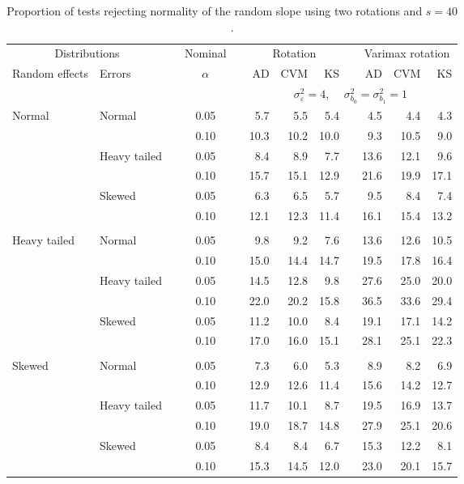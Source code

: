 \begin{table}[ht]
\centering
\caption{\label{tab:fixedsimb140} Proportion of tests rejecting normality of the random slope using two rotations and $s = 40$.}
\begin{scriptsize}
\begin{tabular}{ll p{.1cm} c p{.1cm} rrr p{.1cm} rrr}
  \hline
  \multicolumn{2}{c}{Distributions}& & Nominal & &  \multicolumn{3}{c}{Rotation} & & \multicolumn{3}{c}{Varimax rotation} \\ \cline{1-2} \cline{6-8} \cline{10-12}   
  Random effects & Errors & & $\alpha$ & & AD & CVM & KS & & AD & CVM & KS \\ 
   \hline
& && && \multicolumn{7}{c}{$\sigma_{\varepsilon}^2 = 4$, \ \ $\sigma_{b_0}^2 = \sigma_{b_1}^2 = 1$} \\ \cline{6-12}
\rowcolor{gray!20} Normal & Normal &  & 0.05 &  & 5.7 & 5.5 & 5.4 &  & 4.5 & 4.4 & 4.3 \\ 
\rowcolor{gray!20}    &  &  & 0.10 &  & 10.3 & 10.2 & 10.0 &  & 9.3 & 10.5 & 9.0 \\ 
\rowcolor{gray!20}    & Heavy tailed &  & 0.05 &  & 8.4 & 8.9 & 7.7 &  & 13.6 & 12.1 & 9.6 \\ 
\rowcolor{gray!20}    &  &  & 0.10 &  & 15.7 & 15.1 & 12.9 &  & 21.6 & 19.9 & 17.1 \\ 
\rowcolor{gray!20}    & Skewed &  & 0.05 &  & 6.3 & 6.5 & 5.7 &  & 9.5 & 8.4 & 7.4 \\ 
\rowcolor{gray!20}    &  &  & 0.10 &  & 12.1 & 12.3 & 11.4 &  & 16.1 & 15.4 & 13.2 \\ 
&&&&&&&&&&&\\
  Heavy tailed & Normal &  & 0.05 &  & 9.8 & 9.2 & 7.6 &  & 13.6 & 12.6 & 10.5 \\ 
   &  &  & 0.10 &  & 15.0 & 14.4 & 14.7 &  & 19.5 & 17.8 & 16.4 \\ 
   & Heavy tailed &  & 0.05 &  & 14.5 & 12.8 & 9.8 &  & 27.6 & 25.0 & 20.0 \\ 
   &  &  & 0.10 &  & 22.0 & 20.2 & 15.8 &  & 36.5 & 33.6 & 29.4 \\ 
   & Skewed &  & 0.05 &  & 11.2 & 10.0 & 8.4 &  & 19.1 & 17.1 & 14.2 \\ 
   &  &  & 0.10 &  & 17.0 & 16.0 & 15.1 &  & 28.1 & 25.1 & 22.3 \\ 
&&&&&&&&&&&\\
  Skewed & Normal &  & 0.05 &  & 7.3 & 6.0 & 5.3 &  & 8.9 & 8.2 & 6.9 \\ 
   &  &  & 0.10 &  & 12.9 & 12.6 & 11.4 &  & 15.6 & 14.2 & 12.7 \\ 
   & Heavy tailed &  & 0.05 &  & 11.7 & 10.1 & 8.7 &  & 19.5 & 16.9 & 13.7 \\ 
   &  &  & 0.10 &  & 19.0 & 18.7 & 14.8 &  & 27.9 & 25.1 & 20.6 \\ 
   & Skewed &  & 0.05 &  & 8.4 & 8.4 & 6.7 &  & 15.3 & 12.2 & 8.1 \\ 
   &  &  & 0.10 &  & 15.3 & 14.5 & 12.0 &  & 23.0 & 20.1 & 15.7 \\ 


\end{tabular}
\end{scriptsize}
\end{table}
